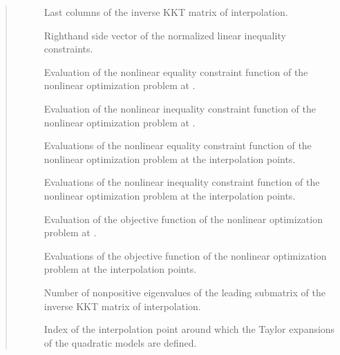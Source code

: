 \documentclass[letterpaper,10pt,english]{sphinxmanual}
\begin{document}
\begin{fulllineitems}
\begin{quote}
\begin{description}
\begin{description}
\item[{}] \leavevmode
\sphinxAtStartPar
Last  columns of the inverse KKT matrix of interpolation.

\item[{}] \leavevmode
\sphinxAtStartPar
Right\sphinxhyphen{}hand side vector of the normalized linear inequality constraints.

\item[{}] \leavevmode
\sphinxAtStartPar
Evaluation of the nonlinear equality constraint function of the nonlinear optimization problem at .

\item[{}] \leavevmode
\sphinxAtStartPar
Evaluation of the nonlinear inequality constraint function of the nonlinear optimization problem at .

\item[{}] \leavevmode
\sphinxAtStartPar
Evaluations of the nonlinear equality constraint function of the nonlinear optimization problem at the interpolation points.

\item[{}] \leavevmode
\sphinxAtStartPar
Evaluations of the nonlinear inequality constraint function of the nonlinear optimization problem at the interpolation points.

\item[{}] \leavevmode
\sphinxAtStartPar
Evaluation of the objective function of the nonlinear optimization problem at .

\item[{}] \leavevmode
\sphinxAtStartPar
Evaluations of the objective function of the nonlinear optimization problem at the interpolation points.

\item[{}] \leavevmode
\sphinxAtStartPar
Number of nonpositive eigenvalues of the leading  submatrix of the inverse KKT matrix of interpolation.

\item[{}] \leavevmode
\sphinxAtStartPar
Index of the interpolation point around which the Taylor expansions of the quadratic models are defined.


\end{description}
\end{description}
\end{quote}
\end{fulllineitems}
\end{document}
